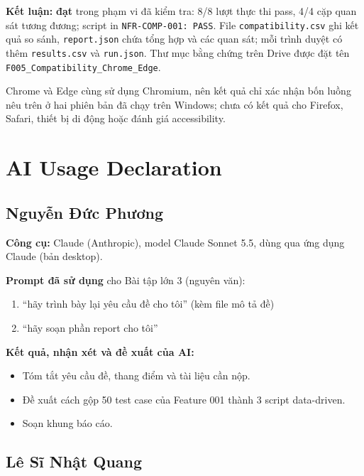 \documentclass[12pt,a4paper]{article}
\begin{document}
\textbf{Kết luận:} \textbf{đạt} trong phạm vi đã kiểm tra: 8/8 lượt thực thi pass,
4/4 cặp quan sát tương đương; script in \texttt{NFR-COMP-001: PASS}.
File \texttt{compatibility.csv} ghi kết quả so sánh, \texttt{report.json} chứa tổng hợp và các quan sát;
mỗi trình duyệt có thêm \texttt{results.csv} và \texttt{run.json}.
Thư mục bằng chứng trên Drive được đặt tên \texttt{F005\_Compatibility\_Chrome\_Edge}.

Chrome và Edge cùng sử dụng Chromium, nên kết quả chỉ xác nhận bốn luồng nêu trên ở hai phiên bản
đã chạy trên Windows; chưa có kết quả cho Firefox, Safari, thiết bị di động hoặc đánh giá accessibility.


\section{AI Usage Declaration}

\subsection{Nguyễn Đức Phương}
\textbf{Công cụ:} Claude (Anthropic), model Claude Sonnet 5.5, dùng qua ứng dụng Claude (bản desktop).

\noindent\textbf{Prompt đã sử dụng} cho Bài tập lớn 3 (nguyên văn):
\begin{enumerate}[noitemsep]
  \item ``hãy trình bày lại yêu cầu đề cho tôi'' (kèm file mô tả đề)
  \item ``hãy soạn phần report cho tôi''
\end{enumerate}

\noindent\textbf{Kết quả, nhận xét và đề xuất của AI:}
\begin{itemize}[noitemsep]
  \item Tóm tắt yêu cầu đề, thang điểm và tài liệu cần nộp.
  \item Đề xuất cách gộp 50 test case của Feature 001 thành 3 script data-driven.
  \item Soạn khung báo cáo.
\end{itemize}

\subsection{Lê Sĩ Nhật Quang}

\end{document}

